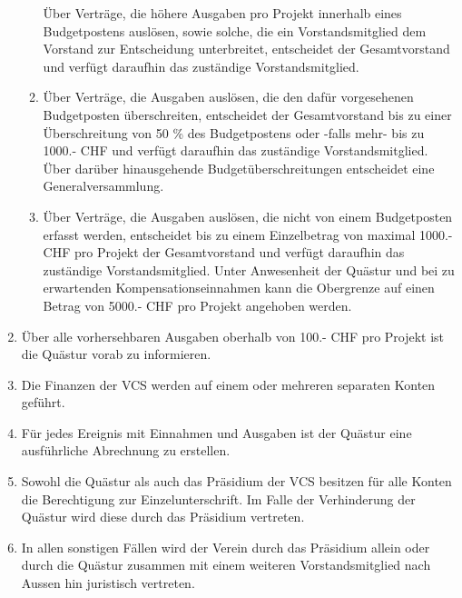 \begin{enumerate}
\begin{enumerate}
        Über Verträge, die höhere Ausgaben pro Projekt innerhalb eines Budgetpostens auslösen, sowie solche, die ein Vorstandsmitglied dem Vorstand zur Entscheidung unterbreitet, entscheidet der Gesamtvorstand und verfügt daraufhin das zuständige Vorstandsmitglied.
      \item Über Verträge, die Ausgaben auslösen, die den dafür vorgesehenen Budgetposten überschreiten, entscheidet der Gesamtvorstand bis zu einer Überschreitung von 50 \% des Budgetpostens oder -falls mehr- bis zu 1000.- CHF und verfügt daraufhin das zuständige Vorstandsmitglied. Über darüber hinausgehende Budgetüberschreitungen entscheidet eine Generalversammlung.
      \item Über Verträge, die Ausgaben auslösen, die nicht von einem Budgetposten erfasst werden, entscheidet bis zu einem Einzelbetrag von maximal 1000.- CHF pro Projekt der Gesamtvorstand und verfügt daraufhin das zuständige Vorstandsmitglied. Unter Anwesenheit der Quästur und bei zu erwartenden Kompensationseinnahmen kann die Obergrenze auf einen Betrag von 5000.- CHF pro Projekt angehoben werden.
    \end{enumerate}
  \item Über alle vorhersehbaren Ausgaben oberhalb von 100.- CHF pro Projekt ist die Quästur vorab zu informieren.
  \item Die Finanzen der VCS werden auf einem oder mehreren separaten Konten geführt.
  \item Für jedes Ereignis mit Einnahmen und Ausgaben ist der Quästur eine ausführliche Abrechnung zu erstellen.
  \item Sowohl die Quästur als auch das Präsidium der VCS besitzen für alle Konten die Berechtigung zur Einzelunterschrift. Im Falle der Verhinderung der Quästur wird diese durch das Präsidium vertreten.
 \item In allen sonstigen Fällen wird der Verein durch das Präsidium allein oder durch die Quästur zusammen mit einem weiteren Vorstandsmitglied nach Aussen hin juristisch vertreten.


\end{enumerate}

